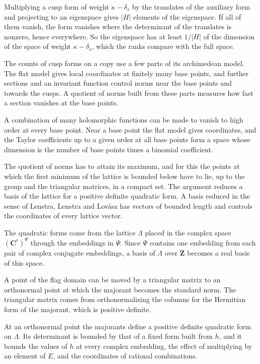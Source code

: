 Multiplying a cusp form of weight $\kappa-\delta_s$ by the translates of the auxiliary form and
projecting to an eigenspace gives $|H|$ elements of the eigenspace. If all of them vanish, the form
vanishes where the determinant of the translates is nonzero, hence everywhere. So the eigenspace has
at least $1/|H|$ of the dimension of the space of weight $\kappa-\delta_s$, which the ranks compare
with the full space.

The counts of cusp forms on a copy use a few parts of its archimedean model. The flat model gives local
coordinates at finitely many base points, and further sections and an invariant function control norms
near the base points and towards the cusps. A quotient of norms built from these parts measures how fast a
section vanishes at the base points.

A combination of many holomorphic functions can be made to vanish to high order at every base point. Near
a base point the flat model gives coordinates, and the Taylor coefficients up to a given order at all base
points form a space whose dimension is the number of base points times a binomial coefficient.

The quotient of norms has to attain its maximum, and for this the points at which the first minimum of the
lattice is bounded below have to lie, up to the group and the triangular matrices, in a compact set. The
argument reduces a basis of the lattice for a positive definite quadratic form. A basis reduced in the
sense of Lenstra, Lenstra and Lovász has vectors of bounded length and controls the coordinates of every
lattice vector.

The quadratic forms come from the lattice $\Lambda$ placed in the complex space $(\mathbf C^r)^\Psi$ through the
embeddings in $\Psi$. Since $\Psi$ contains one embedding from each pair of complex conjugate embeddings, a
basis of $\Lambda$ over $\mathbf Z$ becomes a real basis of this space.

A point of the flag domain can be moved by a triangular matrix to an orthonormal point at which the
majorant becomes the standard norm. The triangular matrix comes from orthonormalizing the columns for the
Hermitian form of the majorant, which is positive definite.

At an orthonormal point the majorants define a positive definite quadratic form on $\Lambda$. Its
determinant is bounded by that of a fixed form built from $h$, and it bounds the values of $h$ at every
complex embedding, the effect of multiplying by an element of $E$, and the coordinates of rational
combinations.

